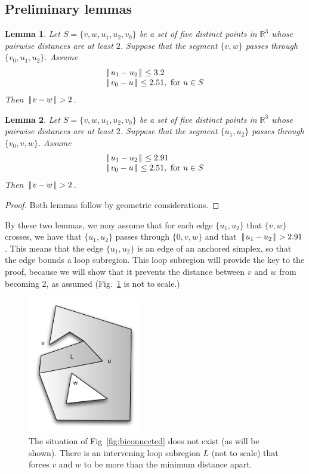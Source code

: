 \documentclass[11pt]{amsart}
\newcommand{\ring}[1]{\mathbb{#1}}
\def\text{\hbox}
\def\|{{\hskip0.1em|\hskip-0.15em|\hskip0.1em}}
\newtheorem{lemma}{Lemma}
\begin{document}
\subsection*{Preliminary lemmas}

\begin{lemma}  Let $S=\{v,w,u_1,u_2,v_0\}$ be a set of five distinct points in $\ring{R}^3$ whose
pairwise distances are at least $2$. Suppose that the segment $\{v,w\}$ passes through
$\{v_0,u_1,u_2\}$. Assume
$$
\begin{array}{lll}
\|u_1-u_2\|\le 3.2\\
\|v_0-u\|\le 2.51,\text{ for } u \in S\\
\end{array}
$$
Then $\|v-w\|>2$.
\end{lemma}

\begin{lemma}  Let $S=\{v,w,u_1,u_2,v_0\}$ be a set of five distinct points in $\ring{R}^3$ whose
pairwise distances are at least $2$. Suppose that the segment $\{u_1,u_2\}$ passes through
$\{v_0,v,w\}$. Assume
$$
\begin{array}{lll}
\|u_1-u_2\|\le 2.91\\
\|v_0-u\|\le 2.51,\text{ for } u \in S\\
\end{array}
$$
Then $\|v-w\|>2$.
\end{lemma}



\begin{proof} Both lemmas follow by geometric considerations.
\end{proof}

By these two lemmas, we may assume that for each edge $\{u_1,u_2\}$ that $\{v,w\}$ crosses,
we have that $\{u_1,u_2\}$ passes through $\{0,v,w\}$ and that $\|u_1-u_2\|>2.91$.  This means that the edge $\{u_1,u_2\}$ is an edge of an anchored simplex,
so that the edge bounds a loop subregion.
This loop subregion will provide the key to the proof, because we will show
that it prevents the distance between $v$ and $w$ from becoming $2$,
as assumed  (Fig.~\ref{fig:biconnectedloop} is not to scale.)

\begin{figure}
\begin{center}
\includegraphics[width=5cm]{biconnectedloop}
\end{center}
\caption{The situation of Fig~\ref{fig:biconnected} does not exist
(as will be shown).  There is an intervening loop subregion $L$ (not to scale) that forces
$v$ and $w$ to be more than the minimum distance apart.}
\label{fig:biconnectedloop}
\end{figure}
\end{document}

